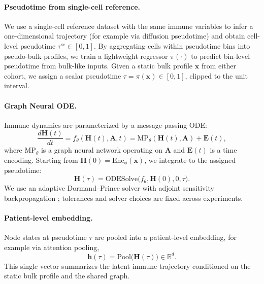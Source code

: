 \documentclass{article}
\begin{document}
\paragraph{Pseudotime from single-cell reference.}
We use a single-cell reference dataset with the same immune variables to infer a one-dimensional trajectory
(for example via diffusion pseudotime) and obtain cell-level pseudotime $\tau^{\mathrm{sc}}\in[0,1]$.
By aggregating cells within pseudotime bins into pseudo-bulk profiles, we train a lightweight regressor
$\pi(\cdot)$ to predict bin-level pseudotime from bulk-like inputs.
Given a static bulk profile $\mathbf{x}$ from either cohort, we assign a scalar pseudotime
$\tau=\pi(\mathbf{x})\in[0,1]$, clipped to the unit interval.

\paragraph{Graph Neural ODE.}
Immune dynamics are parameterized by a message-passing ODE:
\begin{equation}
\frac{d\mathbf{H}(t)}{dt}
= f_{\theta}(\mathbf{H}(t),\mathbf{A},t)
= \mathrm{MP}_{\theta}(\mathbf{H}(t),\mathbf{A})+\mathbf{E}(t),
\label{eq:gnode}
\end{equation}
where $\mathrm{MP}_{\theta}$ is a graph neural network operating on $\mathbf{A}$ and $\mathbf{E}(t)$ is a time encoding.
Starting from $\mathbf{H}(0)=\mathrm{Enc}_\phi(\mathbf{x})$, we integrate to the assigned pseudotime:
\begin{equation}
\mathbf{H}(\tau)=\mathrm{ODESolve}\big(f_{\theta},\mathbf{H}(0),0,\tau\big).
\end{equation}
We use an adaptive Dormand--Prince solver with adjoint sensitivity backpropagation \cite{chen2018neural};
tolerances and solver choices are fixed across experiments.

\paragraph{Patient-level embedding.}
Node states at pseudotime $\tau$ are pooled into a patient-level embedding, for example via attention pooling,
\begin{equation}
\mathbf{h}(\tau)=\mathrm{Pool}\big(\mathbf{H}(\tau)\big)\in\mathbb{R}^{d}.
\end{equation}
This single vector summarizes the latent immune trajectory conditioned on the static bulk profile and the shared graph.
\end{document}
